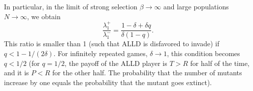 \documentclass[11pt]{article}
\newcommand{\FigEvoProc}{{\bf Fig.~1}}
\newcommand{\FigResultsOverPara}{{\bf Fig.~3}}
\theoremstyle{plainCl1}
\theoremstyle{plainCl2}
\begin{document}
\noindent
In particular, in the limit of strong selection $\beta \rightarrow \infty$ and large populations $N\!\rightarrow \infty$, we obtain
\begin{equation}
\frac{\lambda_1^+}{\lambda_1^-}=
\frac{ 1\!-\!\delta+\delta q}{\delta (1-q)}.
\end{equation}
This ratio is smaller than 1 (such that ALLD is disfavored to invade) if $q<1\!-\!1/(2\delta)$. For infinitely repeated games, $\delta\!\rightarrow\!1$, this condition becomes $q\!<\!1/2$ (for $q\!=\!1/2$, the payoff of the ALLD player is $T\!>\!R$ for half of the time, and it is $P\!<\!R$ for the other half. The probability that the number of mutants increase by one equals the probability that the mutant goes extinct). 



\end{document}
